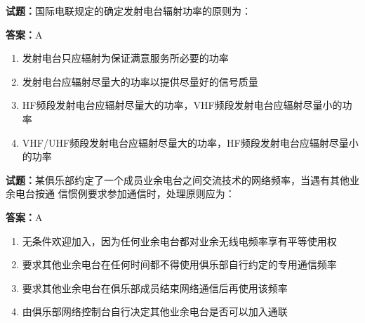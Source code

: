 \documentclass{ctexbook}
\begin{document}




\vspace{1em}

\textbf{试题：}国际电联规定的确定发射电台辐射功率的原则为： 

\textbf{答案：}A 

\begin{enumerate}[leftmargin=3em]
  \item 发射电台只应辐射为保证满意服务所必要的功率 

  \item 发射电台应辐射尽量大的功率以提供尽量好的信号质量 

  \item HF频段发射电台应辐射尽量大的功率，VHF频段发射电台应辐射尽量小的功率 

  \item VHF/UHF频段发射电台应辐射尽量大的功率，HF频段发射电台应辐射尽量小的功率 


\end{enumerate}





\vspace{1em}

\textbf{试题：}某俱乐部约定了一个成员业余电台之间交流技术的网络频率，当遇有其他业余电台按通
信惯例要求参加通信时，处理原则应为： 

\textbf{答案：}A 

\begin{enumerate}[leftmargin=3em]
  \item 无条件欢迎加入，因为任何业余电台都对业余无线电频率享有平等使用权 

  \item 要求其他业余电台在任何时间都不得使用俱乐部自行约定的专用通信频率 

  \item 要求其他业余电台在俱乐部成员结束网络通信后再使用该频率 

  \item 由俱乐部网络控制台自行决定其他业余电台是否可以加入通联 

\end{enumerate}



\end{document}
